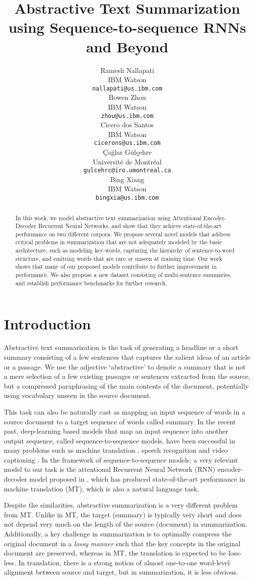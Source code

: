 \documentclass[11pt]{article}
\title{Abstractive Text Summarization using Sequence-to-sequence RNNs and Beyond}
\author{Ramesh Nallapati \\
   IBM Watson \\
   {\tt nallapati@us.ibm.com} \\\And
   Bowen Zhou \\
   IBM Watson \\
   {\tt zhou@us.ibm.com} \\\And
   Cicero  dos Santos \\
   IBM Watson \\
   {\tt cicerons@us.ibm.com} \\\AND
   \c{C}a\u{g}lar G\.{u}l\c{c}ehre \\
   Universit\'e de Montr\'eal \\
   {\tt gulcehrc@iro.umontreal.ca} \\\And
   Bing Xiang \\
   IBM Watson \\
   {\tt bingxia@us.ibm.com} \\
  }
\date{}
\begin{document}
\maketitle
\begin{abstract}
In this work, we model abstractive text summarization using Attentional Encoder-Decoder Recurrent Neural Networks, and show that they achieve state-of-the-art performance on two different corpora. We propose several novel models that address critical problems in summarization that are not adequately modeled by the basic architecture, such as modeling key-words, capturing the hierarchy of sentence-to-word structure, and emitting words that are rare or unseen at training time. Our work shows that many of our proposed models contribute to further improvement in performance. We also propose a new dataset consisting of multi-sentence summaries, and establish performance benchmarks for further research.
\end{abstract}
\section{Introduction}
Abstractive text summarization is the task of generating a headline or a short summary consisting of a few sentences that captures the salient ideas of an article or a passage. We use the adjective `abstractive' to denote a summary that is not a mere selection of a few existing passages or sentences extracted from the source, but a compressed paraphrasing of the main contents of the document, potentially using vocabulary unseen in the source document. 

This task can also be naturally cast as mapping an input sequence of words in a source document to a target sequence of words called summary. In the recent past, deep-learning based models that map an input sequence into another output sequence, called sequence-to-sequence models, have been successful in many problems such as machine translation \cite{nmt}, speech recognition \cite{speech} and video captioning \cite{video_captioning}. In the framework of sequence-to-sequence models, a very relevant model to our task is the attentional Recurrent Neural Network (RNN) encoder-decoder model proposed in 
, which has produced state-of-the-art performance in machine translation (MT), which is also a natural language task.


Despite the similarities, abstractive summarization is a very different problem from MT. Unlike in MT, the target (summary) is typically very short and does not depend very much on the length of the source (document) in summarization. Additionally, a key challenge in summarization is to optimally compress the original document in a {\it lossy manner} such that the key concepts in the original document are preserved, whereas in MT, the translation is expected to be loss-less. In translation, there is a strong notion of almost one-to-one word-level alignment between source and target, but in summarization, it is less obvious. 
\end{document}
